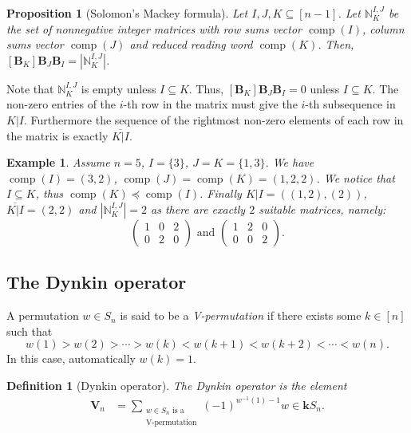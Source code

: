\documentclass[revision]{FPSAC2025}
\newtheorem{defn}{Definition}
\newtheorem{proposition}{Proposition}
\newtheorem{example}{Example}
\newcommand{\kk}{\mathbf{k}} %
\newcommand{\comp}{\operatorname{comp}}
\begin{document}
\begin{proposition}[Solomon's Mackey formula]
\label{prop.solmac}
Let $I, J, K \subseteq [n-1]$.
Let $\mathbb{N}^{I, J}_K$ be the set of nonnegative integer matrices with row sums vector $\comp(I)$, column sums vector $\comp(J)$ and reduced reading word $\comp(K)$.
Then, $[\mathbf{B}_K]\mathbf{B}_J\mathbf{B}_I = |\mathbb{N}^{I, J}_K|$.
\end{proposition}
%
\noindent Note that $\mathbb{N}^{I, J}_K$ is empty unless $I \subseteq K$. Thus, $[\mathbf{B}_K]\mathbf{B}_J\mathbf{B}_I = 0$ unless $I \subseteq K$. 
The non-zero entries of the $i$-th row in the matrix must give the $i$-th subsequence in $K|I$. Furthermore the sequence of the rightmost non-zero elements of each row in the matrix is exactly $\overline{ K|I}$.
\begin{example}
Assume $n=5$, $I=\{3\}$, $J=K=\{1,3\}$. We have $\comp(I)=(3,2)$, $\comp(J) = \comp(K) = (1,2,2)$. We notice that $I\subseteq K$, thus $\comp(K) \preceq \comp(I)$. Finally $K|I=\left((1,2),(2)\right)$,  $\overline{ K|I} = (2,2)$ and $|\mathbb{N}^{I, J}_K| = 2$ as there are exactly $2$ suitable matrices, namely:
\[
\begin{pmatrix}
1&0  &2  \\
0&2  &0
\end{pmatrix}  \text{ and }  
\begin{pmatrix}
1&2  &0 \\
0&0  &2
\end{pmatrix} .
\]

\end{example}

\subsection{The Dynkin operator}
A permutation $w\in S_{n}$ is said to be a
\emph{V-permutation} if there exists some $k\in\left[  n\right]  $ such that%
\[
w\left(  1\right)  >w\left(  2\right)  >\cdots>w\left(  k\right) <w\left(
k+1\right)  <w\left(  k+2\right)  <\cdots<w\left(  n\right).
\]
In this case, automatically $w\left(k\right) = 1$.
\begin{defn}[Dynkin operator]
The \emph{Dynkin operator} is the element
\begin{align*}
\mathbf{V}_{n}  &  =\sum_{\substack{w\in S_{n}\text{ is a}%
\\\text{V-permutation}}}
\left(  -1\right)  ^{w^{-1}\left(  1\right)  -1}w
\in \kk S_n.
\end{align*}
\end{defn}
\end{document}
